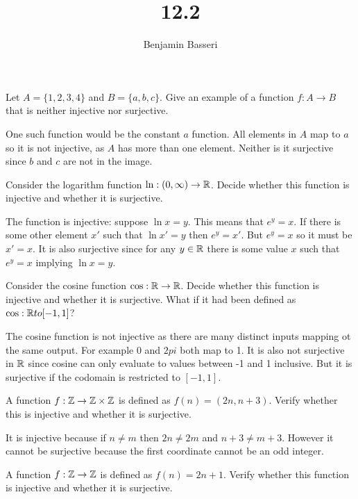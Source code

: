 \documentclass{article}
\title{12.2}
\author{Benjamin Basseri}
\begin{document}
\maketitle

\begin{problem}
Let $A = \{1, 2, 3, 4\}$ and $B = \{a, b, c\}$. Give an example of a function $f: A \to B$ that is neither injective nor surjective.
\end{problem}

One such function would be the constant $a$ function. All elements in $A$ map to $a$ so it is not injective, as $A$ has more than one element. Neither is it surjective since $b$ and $c$ are not in the image.

\begin{problem}
Consider the logarithm function $\ln : (0, \infty) \to \mathbb{R}$. Decide whether this function is injective and whether it is surjective.
\end{problem}

The function is injective: suppose $\ln x = y$. This means that $e^y = x$. If there is some other element $x'$ such that $\ln x' = y$ then $e^y = x'$. But $e^y = x$ so it must be $x' = x$. It is also surjective since for any $y \in \mathbb{R}$ there is some value $x$ such that $e^y = x$ implying $\ln x = y$.

\begin{problem}
Consider the cosine function $\cos: \mathbb{R} \to \mathbb{R}$. Decide whether this function is injective and whether it is surjective. What if it had been defined as $\cos: \mathbb{R} to [-1, 1]$?
\end{problem}

The cosine function is not injective as there are many distinct inputs mapping ot the same output. For example 0 and $2pi$ both map to 1. It is also not surjective in $\mathbb{R}$ since cosine can only evaluate to values between -1 and 1 inclusive. But it is surjective if the codomain is restricted to $[-1, 1]$.

\begin{problem}
A function $f: \mathbb{Z} \to \mathbb{Z} \times \mathbb{Z}$ is defined as $f(n) = (2n, n + 3)$. Verify whether this is injective and whether it is surjective.
\end{problem}

It is injective because if $n \neq m$ then $2n \neq 2m$ and $n +3 \neq m + 3$. However it cannot be surjective because the first coordinate cannot be an odd integer.

\begin{problem}
A function $f: \mathbb{Z} \to \mathbb{Z}$ is defined as $f(n) = 2n + 1$. Verify whether this function is injective and whether it is surjective.
\end{problem}
\end{document}
